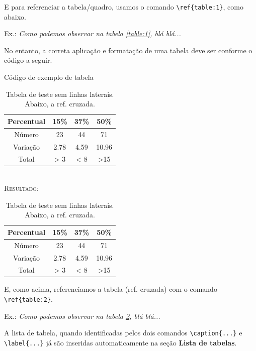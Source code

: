 E para referenciar a tabela/quadro, usamos o comando \verb|\ref{table:1}|, como abaixo.

Ex.: \textit{Como podemos observar na tabela \ref{table:1}, blá blá...}

No entanto, a correta aplicação e formatação de uma tabela deve ser conforme o código a seguir.
\ \\

\begin{codex}{Código de exemplo de tabela}
\begin{table}[h!]
	\begin{center}
	\begin{tabular}{c|c|c|c}
	\hline
	Percentual & 15\% & 37\% & 50\% \\
	\hline
	Número & 23 & 44 & 71 \\
	\hline
	Variação & 2.78 & 4.59 & 10.96 \\
	\hline
	Total & > 3 & < 8 & >15  \\
	\hline
	\end{tabular}
	\caption{Tabela de teste sem linhas laterais. Abaixo, a ref. cruzada.}
	\label{table:2}
	\end{center}
\end{table}
\end{codex}
\ \\

\textsc{Resultado:}

\begin{table}[h!]
	\begin{center}
		\begin{tabular}{c|c|c|c}
			\hline
			Percentual & 15\% & 37\% & 50\% \\
			\hline
			Número & 23 & 44 & 71 \\
			\hline
			Variação & 2.78 & 4.59 & 10.96 \\
			\hline
			Total & > 3 & < 8 & >15  \\
			\hline
		\end{tabular}
		\caption{Tabela de teste sem linhas laterais. Abaixo, a ref. cruzada.}
		\label{table:2}
	\end{center}
\end{table}

E, como acima, referenciamos a tabela (ref. cruzada) com o comando \verb|\ref{table:2}|.

Ex.: \textit{Como podemos observar na tabela \ref{table:2}, blá blá...}

A lista de tabela, quando identificadas pelos dois comandos \verb|\caption{...}| e \verb|\label{...}| já são inseridas automaticamente na seção \textbf{Lista de tabelas}.

